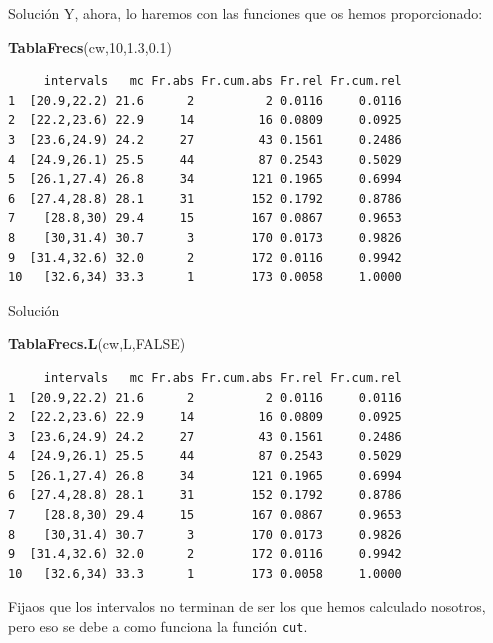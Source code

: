 \documentclass[
  ignorenonframetext,
  aspectratio=169]{beamer}
\newenvironment{Shaded}{\begin{snugshade}}{\end{snugshade}}
\newcommand{\ConstantTok}[1]{\textcolor[rgb]{0.56,0.35,0.01}{#1}}
\newcommand{\DecValTok}[1]{\textcolor[rgb]{0.00,0.00,0.81}{#1}}
\newcommand{\FloatTok}[1]{\textcolor[rgb]{0.00,0.00,0.81}{#1}}
\newcommand{\FunctionTok}[1]{\textcolor[rgb]{0.13,0.29,0.53}{\textbf{#1}}}
\newcommand{\NormalTok}[1]{#1}
\begin{document}
\begin{frame}[fragile]{Solución}
\label{soluciuxf3n-13}
Y, ahora, lo haremos con las funciones que os hemos proporcionado:

\begin{Shaded}
\begin{Highlighting}[]
\FunctionTok{TablaFrecs}\NormalTok{(cw,}\DecValTok{10}\NormalTok{,}\FloatTok{1.3}\NormalTok{,}\FloatTok{0.1}\NormalTok{)}
\end{Highlighting}
\end{Shaded}

\begin{verbatim}
     intervals   mc Fr.abs Fr.cum.abs Fr.rel Fr.cum.rel
1  [20.9,22.2) 21.6      2          2 0.0116     0.0116
2  [22.2,23.6) 22.9     14         16 0.0809     0.0925
3  [23.6,24.9) 24.2     27         43 0.1561     0.2486
4  [24.9,26.1) 25.5     44         87 0.2543     0.5029
5  [26.1,27.4) 26.8     34        121 0.1965     0.6994
6  [27.4,28.8) 28.1     31        152 0.1792     0.8786
7    [28.8,30) 29.4     15        167 0.0867     0.9653
8    [30,31.4) 30.7      3        170 0.0173     0.9826
9  [31.4,32.6) 32.0      2        172 0.0116     0.9942
10   [32.6,34) 33.3      1        173 0.0058     1.0000
\end{verbatim}
\end{frame}

\begin{frame}[fragile]{Solución}
\label{soluciuxf3n-14}
\begin{Shaded}
\begin{Highlighting}[]
\FunctionTok{TablaFrecs.L}\NormalTok{(cw,L,}\ConstantTok{FALSE}\NormalTok{)}
\end{Highlighting}
\end{Shaded}

\begin{verbatim}
     intervals   mc Fr.abs Fr.cum.abs Fr.rel Fr.cum.rel
1  [20.9,22.2) 21.6      2          2 0.0116     0.0116
2  [22.2,23.6) 22.9     14         16 0.0809     0.0925
3  [23.6,24.9) 24.2     27         43 0.1561     0.2486
4  [24.9,26.1) 25.5     44         87 0.2543     0.5029
5  [26.1,27.4) 26.8     34        121 0.1965     0.6994
6  [27.4,28.8) 28.1     31        152 0.1792     0.8786
7    [28.8,30) 29.4     15        167 0.0867     0.9653
8    [30,31.4) 30.7      3        170 0.0173     0.9826
9  [31.4,32.6) 32.0      2        172 0.0116     0.9942
10   [32.6,34) 33.3      1        173 0.0058     1.0000
\end{verbatim}

Fijaos que los intervalos no terminan de ser los que hemos calculado
nosotros, pero eso se debe a como funciona la función \texttt{cut}.
\end{frame}
\end{document}
